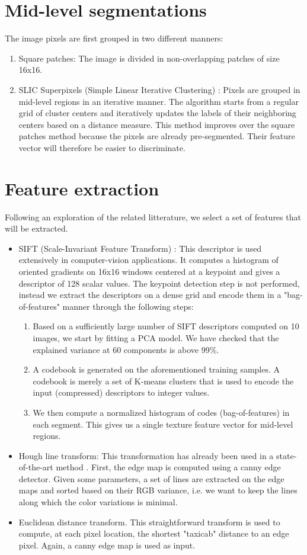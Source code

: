 \documentclass[10pt,conference,compsocconf]{IEEEtran}
\begin{document}
\section{Mid-level segmentations}
\label{sec:orgheadline8}
The image pixels are first grouped in two different manners:
\begin{enumerate}
\item Square patches: The image is divided in non-overlapping patches of size 16x16.
\item SLIC Superpixels (Simple Linear Iterative Clustering) \cite{achanta12}: Pixels are grouped in mid-level regions in an iterative manner. The algorithm starts from a regular grid of cluster centers and iteratively updates the labels of their neighboring centers based on a distance measure. This method improves over the square patches method because the pixels are already pre-segmented. Their feature vector will therefore be easier to discriminate.
\end{enumerate}
\section{Feature extraction}
\label{sec:orgheadline9}
Following an exploration of the related litterature, we select a set of features that will be extracted.
\begin{itemize}
\item SIFT (Scale-Invariant Feature Transform) \cite{lowe99}: This descriptor is used extensively in computer-vision applications. It computes a histogram of oriented gradients on 16x16 windows centered at a keypoint and gives a descriptor of 128 scalar values. The keypoint detection step is not performed, instead we extract the descriptors on a dense grid and encode them in a "bag-of-features" manner through the following steps: 
\begin{enumerate}
\item Based on a sufficiently large number of SIFT descriptors computed on 10 images, we start by fitting a PCA model. We have checked that the explained variance at 60 components is above 99\%.
\item A codebook is generated on the aforementioned training samples. A codebook is merely a set of K-means clusters that is used to encode the input (compressed) descriptors to integer values.
\item We then compute a normalized histogram of codes (bag-of-features) in each segment. This gives us a single texture feature vector for mid-level regions.
\end{enumerate}
\item Hough line transform: This transformation has already been used in a state-of-the-art method \cite{2016ISPAr41B3..891L}. First, the edge map is computed using a canny edge detector. Given some parameters, a set of lines are extracted on the edge maps and sorted based on their RGB variance, i.e. we want to keep the lines along which the color variations is minimal.
\item Euclidean distance transform. This straightforward transform is used to compute, at each pixel location, the shortest "taxicab" distance to an edge pixel. Again, a canny edge map is used as input.
\end{itemize}
\end{document}
